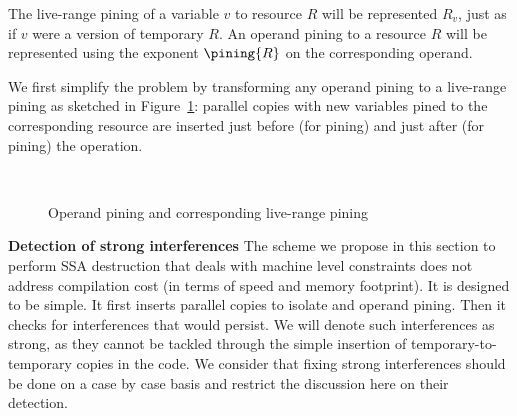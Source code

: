 The live-range pining of a variable $v$ to resource $R$ will be represented $R_v$, just as if $v$ were a version of temporary $R$. An operand pining to a resource $R$ will be represented using the exponent $\pining{R}$ on the corresponding operand. 

We first simplify the problem by transforming any operand pining to a live-range pining as sketched in Figure~\ref{fig:alternative_ssa_destruction:pining}: parallel copies with new variables pined to the corresponding resource are inserted just before (for \useop pining) and just after (for  pining) the operation.

\begin{figure}[h]
\hfill
{}
\\
\hfill
{}
\caption{\label{fig:alternative_ssa_destruction:pining}Operand pining and corresponding live-range pining}
\end{figure}


{\bf Detection of strong interferences}
\label{par:alternative_ssa_destruction:strong}
The scheme we propose in this section to perform SSA destruction that deals with machine level constraints does not address compilation cost (in terms of speed and memory footprint). It is designed to be simple. It first inserts parallel copies to isolate \phifuns and operand pining. Then it checks for interferences that would persist. We will denote such interferences as strong, as they cannot be tackled through the simple insertion of temporary-to-temporary copies in the code. We consider that fixing strong interferences should be done on a case by case basis and restrict the discussion here on their detection.

